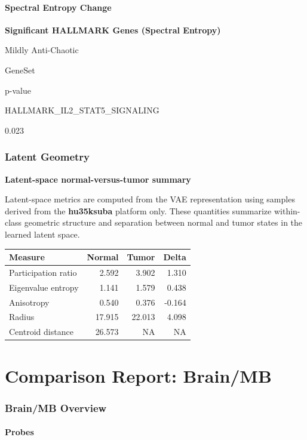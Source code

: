 \documentclass[
  letterpaper,
  DIV=11,
  numbers=noendperiod,
  openany,
  oneside]{scrreprt}
\begin{document}
\subsubsection{Spectral Entropy Change}

\textbf{Significant HALLMARK Genes (Spectral Entropy)}

Mildly Anti-Chaotic

GeneSet

p-value

HALLMARK\_IL2\_STAT5\_SIGNALING

0.023

\subsection{Latent Geometry}

\textbf{Latent-space normal-versus-tumor summary}

Latent-space metrics are computed from the VAE representation using
samples derived from the \textbf{hu35ksuba} platform only. These
quantities summarize within-class geometric structure and separation
between normal and tumor states in the learned latent space.

\begin{longtable}[]{@{}lrrr@{}}
\toprule\noalign{}
Measure & Normal & Tumor & Delta \\
\midrule\noalign{}
\endhead
\bottomrule\noalign{}
\endlastfoot
Participation ratio & 2.592 & 3.902 & 1.310 \\
Eigenvalue entropy & 1.141 & 1.579 & 0.438 \\
Anisotropy & 0.540 & 0.376 & -0.164 \\
Radius & 17.915 & 22.013 & 4.098 \\
Centroid distance & 26.573 & NA & NA \\
\end{longtable}

\chapter{Comparison Report: Brain/MB}\label{comparison-report-brainmb}

\subsection{Brain/MB Overview}

\subsubsection{Probes}
\end{document}

